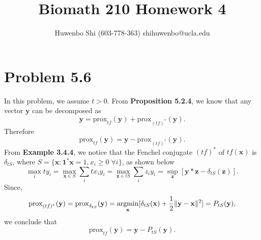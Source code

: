 \documentclass{scrartcl}
\begin{document}

\newcommand*{\TitleFont}{
      \usefont{\encodingdefault}{\rmdefault}{b}{n}
      \fontsize{16}{20}
      \selectfont}
\newcommand*{\AuthorFont}{
      \usefont{\encodingdefault}{\rmdefault}{r}{n}
      \fontsize{12}{20}
      \selectfont}
\title{\TitleFont Biomath 210 Homework 4}
\author{\AuthorFont Huwenbo Shi (603-778-363) shihuwenbo@ucla.edu}
\maketitle

\newcommand*{\argmin}{\operatornamewithlimits{argmin}\limits}
\newcommand*{\argmax}{\operatornamewithlimits{argmax}\limits}
\newcommand{\tr}{\mathrm{tr}}
\newcommand{\dom}{\mathrm{dom}}
\newcommand{\E}{\mathrm{E}}
\newcommand{\prox}{\mathrm{prox}}
\newcommand{\epi}{\mathrm{epi}}
\def\mb#1{\mathbf{#1}}


\section*{Problem 5.6}

In this problem, we assume $t > 0$. From \textbf{Proposition 5.2.4}, we know that any vector $\mb{y}$ can be decomposed as
\begin{equation}
\mb{y} = \prox_{tf}(\mb{y}) + \prox_{(tf)^*}(\mb{y}).
\end{equation}
Therefore
\begin{equation}
\prox_{tf}(\mb{y}) = \mb{y} - \prox_{(tf)^*}(\mb{y}).
\end{equation}
From \textbf{Example 3.4.4}, we notice that the Fenchel conjugate $(tf)^*$ of $tf(\mb{x})$ is $\delta_{tS}$,
where $S = \{\mb{x} : \mb{1}^*\mb{x} = 1, x_i \ge 0 \; \forall i\}$, as shown below
\begin{equation}
\max_{i} t y_i = \max_{\mb{x} \in S} \sum_{i} t x_i y_i = \max_{\mb{z} \in tS} \sum_{i} z_i y_i
= \sup_{\mb{z}} [\mb{y}*{\mb{z}}-\delta_{tS}(\mb{z})].
\end{equation}
Since,
\begin{equation}
\prox_{(tf)^*}(\mb{y}) = \prox_{\delta_{tS}}(\mb{y})
= \argmin_{\mb{x}} [\delta_{tS}(\mb{x})+{1 \over 2} \|\mb{y}-\mb{x}\|^2]
= P_{tS}(\mb{y}),
\end{equation}
we conclude that
\begin{equation}
\prox_{tf}(\mb{y}) = \mb{y} - P_{tS}(\mb{y}).
\end{equation}
\end{document}
